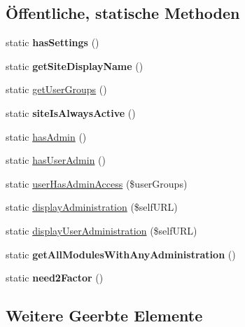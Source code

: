\subsection*{Öffentliche, statische Methoden}
\begin{DoxyCompactItemize}
\item 
\mbox{\label{classadministration_af078c68c6ffc75ded29ee68560eec759}} 
static {\bfseries has\+Settings} ()
\item 
\mbox{\label{classadministration_a3313fc8c0f830d2ffabb08a0111895ae}} 
static {\bfseries get\+Site\+Display\+Name} ()
\item 
static \mbox{\hyperlink{classadministration_a51f141761c57486d166d15aa3f873534}{get\+User\+Groups}} ()
\item 
\mbox{\label{classadministration_ae6807fb0c34ef0fa30d11add220ebd1c}} 
static {\bfseries site\+Is\+Always\+Active} ()
\item 
static \mbox{\hyperlink{classadministration_a500529e718fd5775e5bcc326b168781d}{has\+Admin}} ()
\item 
static \mbox{\hyperlink{classadministration_a497ff7a8a447f8a9f8cee175723e730c}{has\+User\+Admin}} ()
\item 
static \mbox{\hyperlink{classadministration_a6854e2cbbf4a76ec16895a1a1e58b12c}{user\+Has\+Admin\+Access}} (\$user\+Groups)
\item 
static \mbox{\hyperlink{classadministration_ab831a59891053402578ba3a98ec57b30}{display\+Administration}} (\$self\+U\+RL)
\item 
static \mbox{\hyperlink{classadministration_ab40ac15abebd8cd56a6c032357b202d8}{display\+User\+Administration}} (\$self\+U\+RL)
\item 
\mbox{\label{classadministration_a11606cd887392911aac6633f2a9998f2}} 
static {\bfseries get\+All\+Modules\+With\+Any\+Administration} ()
\item 
\mbox{\label{classadministration_a7f3e3f7d0b907e8677b305fd6c3df7a7}} 
static {\bfseries need2\+Factor} ()
\end{DoxyCompactItemize}
\subsection*{Weitere Geerbte Elemente}


